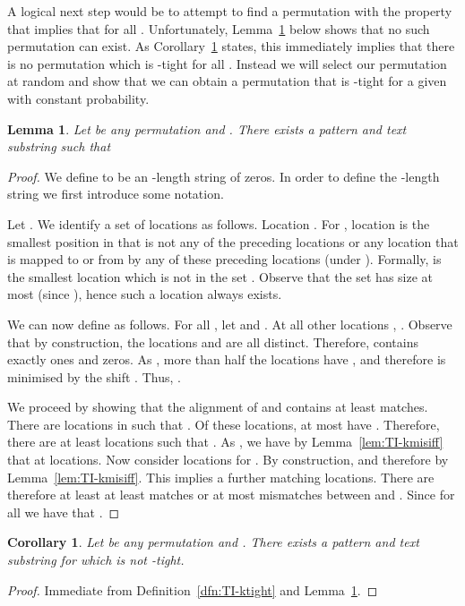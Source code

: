 \documentclass[11pt]{article}
\theoremstyle{plain}
\newtheorem{lemma}[theorem]{Lemma}
\newtheorem{corollary}[theorem]{Corollary}
\theoremstyle{definition}
\begin{document}
A logical next step would be to attempt to find a permutation  with the property that  implies that  for all . Unfortunately, Lemma~\ref{lem:notconv} below shows that no such permutation can exist. As Corollary~\ref{cor:notktight} states, this immediately implies that there is no permutation which is -tight for all . Instead we will select our permutation at random and show that we can obtain a permutation that is -tight for a given  with constant probability.


\begin{lemma}
    \label{lem:notconv}
    Let  be any permutation and . There exists a pattern  and text substring  such that

\end{lemma}
\begin{proof}
    We define  to be an -length string of zeros. In order to define the -length string  we first introduce some notation.

    Let . We identify a set of  locations  as follows. Location . For , location  is the smallest position in  that is not any of the preceding locations  or any location that is mapped to or from by any of these preceding locations (under ). Formally,  is the smallest location which is not in the set . Observe that the set  has size at most  (since ), hence such a location always exists.

    We can now define  as follows. For all , let  and . At all other locations , . Observe that by construction, the locations  and  are all distinct. Therefore,  contains exactly  ones and  zeros. As , more than half the locations have , and therefore  is minimised by the shift . Thus, .

    We proceed by showing that the alignment of  and  contains at least  matches. There are  locations  in  such that . Of these locations, at most  have . Therefore, there are at least  locations  such that . As , we have by Lemma~\ref{lem:TI-kmisiff} that  at  locations. Now consider locations  for . By construction,  and therefore  by Lemma~\ref{lem:TI-kmisiff}. This implies a further  matching locations. There are therefore at least at least  matches or at most  mismatches between  and . Since  for all  we have that .
\end{proof}

\begin{corollary}
    \label{cor:notktight}
    Let  be any permutation and . There exists a pattern  and text substring  for which  is not -tight.
\end{corollary}
\begin{proof}
Immediate from Definition~\ref{dfn:TI-ktight} and Lemma~\ref{lem:notconv}.
\end{proof}
\end{document}
